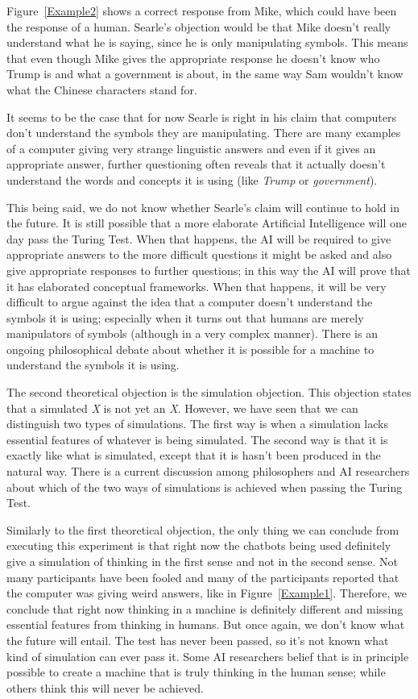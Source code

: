 Figure~\ref{Example2} shows a correct response from Mike, which could have been the response of a human. Searle’s objection would be that Mike doesn’t really understand what he is saying, since he is only manipulating symbols. This means that even though Mike gives the appropriate response he doesn’t know who Trump is and what a government is about, in the same way Sam wouldn’t know what the Chinese characters stand for.

It seems to be the case that for now Searle is right in his claim that computers don’t understand the symbols they are manipulating. There are many examples of a computer giving very strange linguistic answers and even if it gives an appropriate answer, further questioning often reveals that it actually doesn’t understand the words and concepts it is using (like \textit{Trump} or \textit{government}).

This being said, we do not know whether Searle’s claim will continue to hold in the future. It is still possible that a more elaborate Artificial Intelligence will one day pass the Turing Test. When that happens, the AI will be required to give appropriate answers to the more difficult questions it might be asked and also give appropriate responses to further questions; in this way the AI will prove that it has elaborated conceptual frameworks. When that happens, it will be very difficult to argue against the idea that a computer doesn’t understand the symbols it is using; especially when it turns out that humans are merely manipulators of symbols (although in a very complex manner). There is an ongoing philosophical debate about whether it is possible for a machine to understand the symbols it is using.

The second theoretical objection is the simulation objection. This objection states that a simulated \textit{X} is not yet an \textit{X}. However, we have seen that we can distinguish two types of simulations. The first way is when a simulation lacks essential features of whatever is being simulated. The second way is that it is exactly like what is simulated, except that it is hasn’t been produced in the natural way. There is a current discussion among philosophers and AI researchers about which of the two ways of simulations is achieved when passing the Turing Test.

Similarly to the first theoretical objection, the only thing we can conclude from executing this experiment is that right now the chatbots being used definitely give a simulation of thinking in the first sense and not in the second sense. Not many participants have been fooled and many of the participants reported that the computer was giving weird answers, like in Figure~\ref{Example1}. Therefore, we conclude that right now thinking in a machine is definitely different and missing essential features from thinking in humans. But once again, we don’t know what the future will entail. The test has never been passed, so it’s not known what kind of simulation can ever pass it. Some AI researchers belief that is in principle possible to create a machine that is truly thinking in the human sense; while others think this will never be achieved.

